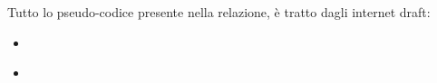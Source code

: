 Tutto lo pseudo-codice presente nella relazione, è tratto dagli internet draft:

\begin{itemize}

\item \cite{ietf:draft-cardwell-iccrg-bbr-congestion-control-00}
\item \cite{ietf:draft-cheng-iccrg-delivery-rate-estimation-00}

\end{itemize}